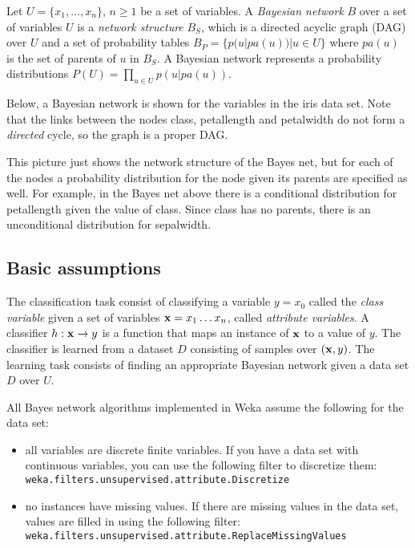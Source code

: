 \documentclass[a4paper]{article}
\begin{document}
Let $U=\{x_1,\ldots,x_n\}$, $n\ge 1$ be a set of variables.
%
A {\em Bayesian network} $B$ over a set of variables $U$ is a {\em
network  structure} $B_S$, which is a directed acyclic graph (DAG)
over $U$ and a set of  probability tables $B_P = \{p(u|pa(u)) | u\in
U\}$ where $pa(u)$ is the set of parents of $u$ in $B_S$. A Bayesian
network represents a probability distributions $P(U) = \prod_{u\in
U}p(u|pa(u))$.

Below, a Bayesian network is shown for the variables in the iris data set.
Note that the links between the nodes class, petallength and petalwidth 
do not form a {\em directed} cycle, so the graph is a proper DAG.


\begin{center}
\end{center}

This picture just shows the network structure of the Bayes net, but for
each of the nodes a probability distribution for the node given its parents
are specified as well. For example, in the Bayes net above there is a conditional distribution
for petallength given the value of class. Since class has no
parents, there is an unconditional distribution for sepalwidth.

\subsection*{Basic assumptions}

The classification task consist of classifying a 
variable $y=x_0$ called the {\em class variable} given a set of variables 
${\bf x} = x_1\ldots x_n$, called {\em attribute variables}. 
A classifier $h:{\bf x}\to y$
is a function that maps an instance of $\bf x$ to a value of $y$.
The classifier is learned from a dataset $D$ consisting of samples 
over $({\bf x}, y)$.
%
The learning task consists of finding an appropriate Bayesian network  
given a data set $D$ over $U$.  

All Bayes network algorithms implemented in Weka assume the following
for the data set:
\begin{itemize}
\item all variables are discrete finite variables. If you have a data set
with continuous variables, you can use the following filter to discretize them:\\
{\tt weka.filters.unsupervised.attribute.Discretize} 
\item no instances have missing values. If there are missing values in the
data set, values are filled in using the following filter:\\
{\tt weka.filters.unsupervised.attribute.ReplaceMissingValues}
\end{itemize}
\end{document}

